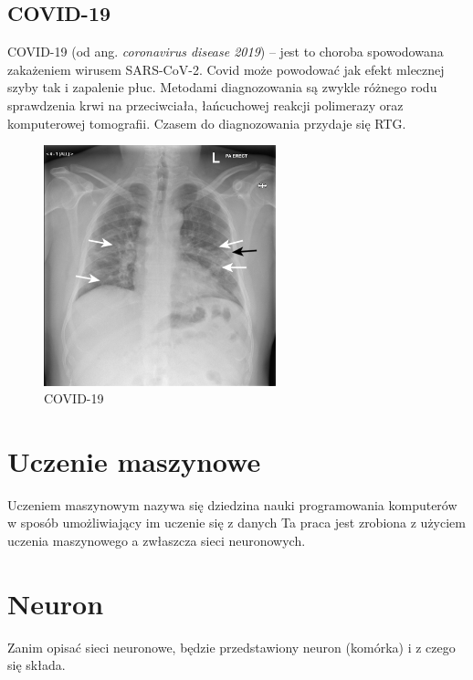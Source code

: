 \documentclass{article}
\begin{document}
\subsection{COVID-19}
COVID-19 (od ang. \textit{coronavirus disease 2019}) – jest to choroba spowodowana zakażeniem wirusem SARS-CoV-2. Covid może powodować jak efekt mlecznej szyby tak i zapalenie płuc. Metodami diagnozowania są zwykle różnego rodu sprawdzenia krwi na przeciwciała, łańcuchowej reakcji polimerazy oraz komputerowej tomografii. Czasem do diagnozowania przydaje się RTG.

\begin{figure}[H]
	\centering
	\includegraphics[width=0.6\textwidth,keepaspectratio=true]{covid}
	\caption{
		COVID-19
	}
\end{figure}

\section{Uczenie maszynowe}
Uczeniem maszynowym nazywa się dziedzina nauki programowania komputerów w sposób umożliwiający im uczenie się z danych \cite{geron} 
Ta praca jest zrobiona z użyciem uczenia maszynowego a zwłaszcza sieci neuronowych.


\section{Neuron}
Zanim opisać sieci neuronowe, będzie przedstawiony neuron (komórka) i z czego się składa.
\end{document}
